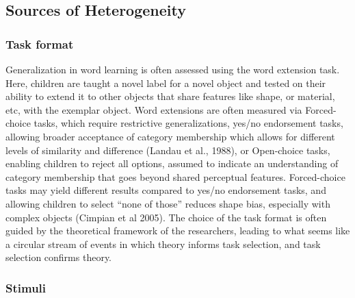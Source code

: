 \documentclass[10pt, letterpaper]{article}
\begin{document}
\hypertarget{sources-of-heterogeneity}{%
\subsection{Sources of Heterogeneity}\label{sources-of-heterogeneity}}

\hypertarget{task-format}{%
\subsubsection{Task format}\label{task-format}}

Generalization in word learning is often assessed using the word
extension task. Here, children are taught a novel label for a novel
object and tested on their ability to extend it to other objects that
share features like shape, or material, etc, with the exemplar object.
Word extensions are often measured via Forced-choice tasks, which
require restrictive generalizations, yes/no endorsement tasks, allowing
broader acceptance of category membership which allows for different
levels of similarity and difference (Landau et al., 1988), or
Open-choice tasks, enabling children to reject all options, assumed to
indicate an understanding of category membership that goes beyond shared
perceptual features. Forced-choice tasks may yield different results
compared to yes/no endorsement tasks, and allowing children to select
``none of those'' reduces shape bias, especially with complex objects
(Cimpian et al 2005). The choice of the task format is often guided by
the theoretical framework of the researchers, leading to what seems like
a circular stream of events in which theory informs task selection, and
task selection confirms theory.

\hypertarget{stimuli}{%
\subsubsection{Stimuli}\label{stimuli}}
\end{document}

